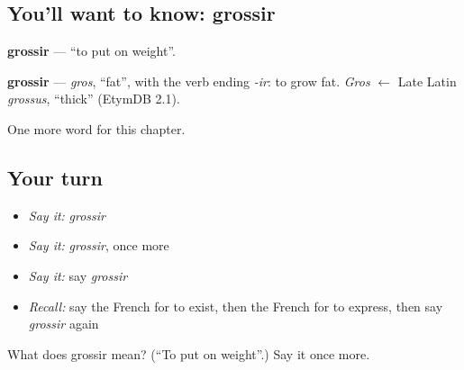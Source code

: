 \subsection*{You'll want to know: grossir}
\textbf{grossir} — \textquotedblleft{}to put on weight\textquotedblright{}.

\begin{cousinweb}
\textbf{grossir} — \emph{gros}, \textquotedblleft{}fat\textquotedblright{}, with the verb ending \emph{-ir}: to grow fat. \emph{Gros} $\leftarrow$ Late Latin \emph{grossus}, \textquotedblleft{}thick\textquotedblright{} (EtymDB 2.1).
\end{cousinweb}

\begin{grammarlens}[title={What you've built}]
One more word for this chapter.
\end{grammarlens}

\subsection*{Your turn}
\begin{itemize}
\raggedright
  \item \emph{Say it:} \emph{grossir}
  \item \emph{Say it:} \emph{grossir}, once more
  \item \emph{Say it:} say \emph{grossir}
  \item \emph{Recall:} say the French for to exist, then the French for to express, then say \emph{grossir} again
\end{itemize}

\begin{tcolorbox}[breakable,colback=teal!4,colframe=teal!35!black,title={Before you move on}]
What does grossir mean? (\textquotedblleft{}To put on weight\textquotedblright{}.) Say it once more.
\end{tcolorbox}
